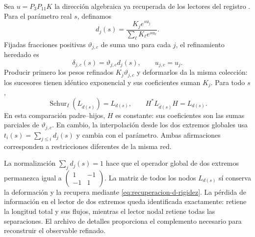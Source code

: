 Sea \(u=P_3P_{11}K\) la dirección algebraica ya recuperada de los
lectores del registro \cite{hmtX}. Para el parámetro real \(s\), definamos
\[
 d_j(s)=\frac{K_je^{su_j}}{\sum_\ell K_\ell e^{su_\ell}}.
\]
Fijadas fracciones positivas \(\vartheta_{j,c}\) de suma uno para cada
\(j\), el refinamiento heredado es
\[
 \delta_{j,c}(s)=\vartheta_{j,c}d_j(s),\qquad
 u_{j,c}=u_j.
\]
Producir primero los pesos refinados \(K_j\vartheta_{j,c}\) y
deformarlos da la misma colección: los sucesores tienen idéntico exponencial y
sus coeficientes suman \(K_j\). Para todo \(s\),
\begin{equation}
 \operatorname{Schur}_{I}(L_{\widetilde d(s)})=L_{d(s)},
 \qquad H^*L_{\widetilde d(s)}H=L_{d(s)}.
 \label{eq:schur-flujo-k}
\end{equation}
En esta comparación padre--hijos, \(H\) es constante: sus coeficientes
son las sumas parciales de \(\vartheta_{j,c}\). En cambio, la
interpolación desde los dos extremos globales usa
\(t_i(s)=\sum_{j\le i}d_j(s)\) y cambia con el parámetro. Ambas
afirmaciones corresponden a restricciones diferentes de la misma red.

La normalización \(\sum_jd_j(s)=1\) hace que el operador global de dos
extremos permanezca igual a
\(\left(\begin{smallmatrix}1&-1\\-1&1\end{smallmatrix}\right)\).
La matriz de todos los nodos \(L_{d(s)}\) sí conserva la deformación y
la recupera mediante \eqref{eq:recuperacion-d-rigidez}. La pérdida de
información en el lector de dos extremos queda identificada exactamente:
retiene la longitud total y sus flujos, mientras el lector nodal retiene
todas las separaciones. El archivo de detalles proporciona el complemento
necesario para reconstruir el observable refinado.
